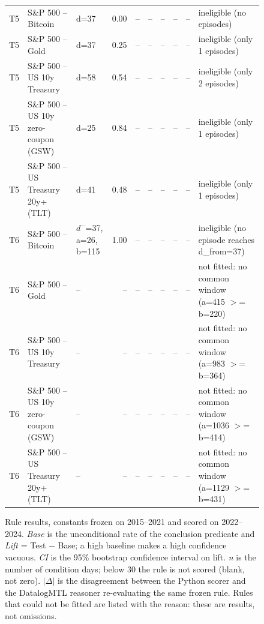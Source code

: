 \begin{figure}
\begin{tabular}{lllrrrrrrl}
T5 & S\&P 500 -- Bitcoin & d=37 & 0.00 & -- & -- & -- & -- & -- & ineligible (no episodes) \\
T5 & S\&P 500 -- Gold & d=37 & 0.25 & -- & -- & -- & -- & -- & ineligible (only 1 episodes) \\
T5 & S\&P 500 -- US 10y Treasury & d=58 & 0.54 & -- & -- & -- & -- & -- & ineligible (only 2 episodes) \\
T5 & S\&P 500 -- US 10y zero-coupon (GSW) & d=25 & 0.84 & -- & -- & -- & -- & -- & ineligible (only 1 episodes) \\
T5 & S\&P 500 -- US Treasury 20y+ (TLT) & d=41 & 0.48 & -- & -- & -- & -- & -- & ineligible (only 1 episodes) \\
T6 & S\&P 500 -- Bitcoin & $d^-$=37, a=26, b=115 & 1.00 & -- & -- & -- & -- & -- & ineligible (no episode reaches d\_from=37) \\
T6 & S\&P 500 -- Gold & -- & -- & -- & -- & -- & -- & -- & not fitted: no common window (a=415 $>$= b=220) \\
T6 & S\&P 500 -- US 10y Treasury & -- & -- & -- & -- & -- & -- & -- & not fitted: no common window (a=983 $>$= b=364) \\
T6 & S\&P 500 -- US 10y zero-coupon (GSW) & -- & -- & -- & -- & -- & -- & -- & not fitted: no common window (a=1036 $>$= b=414) \\
T6 & S\&P 500 -- US Treasury 20y+ (TLT) & -- & -- & -- & -- & -- & -- & -- & not fitted: no common window (a=1129 $>$= b=431) \\
\bottomrule
\end{tabular}
\caption{Rule results, constants frozen on 2015--2021 and scored on 2022--2024. \emph{Base} is the unconditional rate of the conclusion predicate and \emph{Lift} = Test $-$ Base; a high baseline makes a high confidence vacuous. \emph{CI} is the 95\% bootstrap confidence interval on lift. \emph{n} is the number of condition days; below 30 the rule is not scored (blank, not zero). $|\Delta|$ is the disagreement between the Python scorer and the DatalogMTL reasoner re-evaluating the same frozen rule. Rules that could not be fitted are listed with the reason: these are results, not omissions.}
\label{tab:rule-results}
\end{figure}
